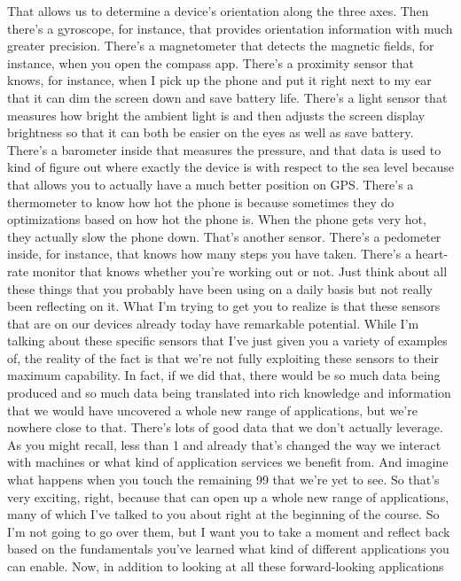 That allows us to determine a device's orientation along the three axes.
Then there's a gyroscope, for instance, that provides orientation information
with much greater precision.
There's a magnetometer that detects the magnetic fields, for instance,
when you open the compass app.
There's a proximity sensor that knows, for instance, when I pick up the phone
and put it right next to my ear that it can dim the screen down
and save battery life.
There's a light sensor that measures how bright
the ambient light is and then adjusts the screen display brightness
so that it can both be easier on the eyes as well as save battery.
There's a barometer inside that measures the pressure,
and that data is used to kind of figure out where exactly the device is
with respect to the sea level because that allows you to actually
have a much better position on GPS.
There's a thermometer to know how hot the phone is because sometimes they
do optimizations based on how hot the phone is.
When the phone gets very hot, they actually slow the phone down.
That's another sensor.
There's a pedometer inside, for instance, that
knows how many steps you have taken.
There's a heart-rate monitor that knows whether you're working out or not.
Just think about all these things that you
probably have been using on a daily basis
but not really been reflecting on it.
What I'm trying to get you to realize is that these sensors
that are on our devices already today have remarkable potential.
While I'm talking about these specific sensors
that I've just given you a variety of examples of, the reality of the fact
is that we're not fully exploiting these sensors to their maximum capability.
In fact, if we did that, there would be so much data being produced
and so much data being translated into rich knowledge and information
that we would have uncovered a whole new range of applications,
but we're nowhere close to that.
There's lots of good data that we don't actually leverage.
As you might recall, less than 1%
and already that's changed the way we interact with machines
or what kind of application services we benefit from.
And imagine what happens when you touch the remaining 99%
that we're yet to see.
So that's very exciting, right, because that can open up
a whole new range of applications, many of which
I've talked to you about right at the beginning of the course.
So I'm not going to go over them, but I want you to take a moment
and reflect back based on the fundamentals you've
learned what kind of different applications you can enable.
Now, in addition to looking at all these forward-looking applications
